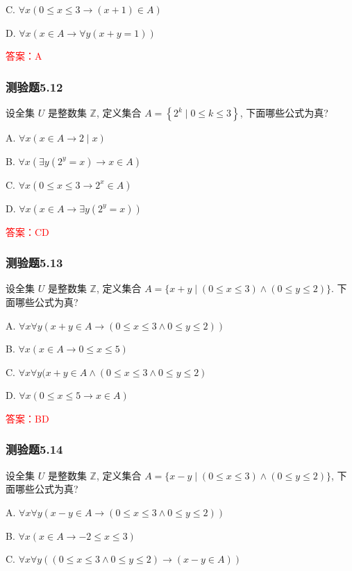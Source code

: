 \documentclass[UTF8, heading=true]{ctexart}
\begin{document}
C. $\forall x(0 \leq x \leq 3 \rightarrow(x+1) \in A)$

D. $\forall x(x \in A \rightarrow \forall y(x+y=1))$

\textcolor{red}{答案：A}


\subsubsection{测验题5.12}

设全集 $U$ 是整数集 $\mathbb{Z}$, 定义集合 $A=\left\{2^k \mid 0 \leq k \leq 3\right\}$, 下面哪些公式为真?

A. $\forall x(x \in A \rightarrow 2 \mid x)$

B. $\forall x\left(\exists y\left(2^y=x\right) \rightarrow x \in A\right)$

C. $\forall x\left(0 \leq x \leq 3 \rightarrow 2^x \in A\right)$

D. $\forall x\left(x \in A \rightarrow \exists y\left(2^y=x\right)\right)$

\textcolor{red}{答案：CD}

\subsubsection{测验题5.13}

设全集 $U$ 是整数集 $\mathbb{Z}$, 定义集合 $A=\{x+y \mid(0 \leq x \leq 3) \wedge(0 \leq y \leq 2)\}$. 下面哪些公式为真?

A. $\forall x \forall y(x+y \in A \rightarrow(0 \leq x \leq 3 \wedge 0 \leq y \leq 2))$

B. $\forall x(x \in A \rightarrow 0 \leq x \leq 5)$

C. $\forall x \forall y(x+y \in A \wedge(0 \leq x \leq 3 \wedge 0 \leq y \leq 2)$

D. $\forall x(0 \leq x \leq 5 \rightarrow x \in A)$

\textcolor{red}{答案：BD}


\subsubsection{测验题5.14}
设全集 $U$ 是整数集 $\mathbb{Z}$, 定义集合 $A=\{x-y \mid(0 \leq x \leq 3) \wedge(0 \leq y \leq 2)\}$, 下面哪些公式为真?

A. 
$
\forall x \forall y(x-y \in A \rightarrow(0 \leq x \leq 3 \wedge 0 \leq y \leq 2))
$

B. 
$
\forall x(x \in A \rightarrow-2 \leq x \leq 3)
$

C. 
$
\forall x \forall y((0 \leq x \leq 3 \wedge 0 \leq y \leq 2) \rightarrow(x-y \in A))
$
\end{document}
